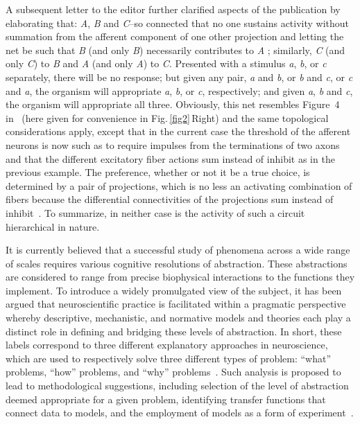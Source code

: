 \documentclass[10pt,letterpaper]{article}
\begin{document}
A subsequent letter to the editor further clarified aspects of the publication by elaborating that: {\it{A}}, {\it{B}} and {\it{C}}--so connected that no one sustains activity without summation from the afferent component of one other projection and letting the net be such that {\it{B}} (and only {\it{B}}) necessarily contributes to {\it{A}} ; similarly, {\it{C}} (and only {\it{C}}) to {\it{B}} and {\it{A}} (and only {\it{A}}) to {\it{C}}. Presented with a stimulus {\it{a}}, {\it{b}}, or {\it{c}} separately, there will be no response; but given any pair, {\it{a}} and {\it{b}}, or {\it{b}} and {\it{c}}, or {\it{c}} and {\it{a}}, the organism will appropriate {\it{a}}, {\it{b}}, or {\it{c}}, respectively; and given {\it{a}}, {\it{b}} and {\it{c}}, the organism will appropriate all three. Obviously, this net resembles Figure~4 in~\cite{mcculloch45a} (here given for convenience in Fig.\,\ref{fig2}\,Right) and the same topological considerations apply, except that in the current case the threshold of the afferent neurons is now such as to require impulses from the terminations of two axons and that the different excitatory fiber actions sum instead of inhibit as in the previous example. The preference, whether or not it be a true choice, is determined by a pair of projections, which is no less an activating combination of fibers because the differential connectivities of the projections sum instead of inhibit~\cite{mcculloch45b}. To summarize, in neither case is the activity of such a circuit hierarchical in nature.

It is currently believed that a successful study of phenomena across a wide range of scales requires various cognitive resolutions of abstraction. These abstractions are considered to range from precise biophysical interactions to the functions they implement. To introduce a widely promulgated view of the subject, it has been argued that neuroscientific practice is facilitated within a pragmatic perspective whereby descriptive, mechanistic, and normative models and theories each play a distinct role in defining and bridging these levels of abstraction. In short, these labels correspond to three different explanatory approaches in neuroscience, which are used to respectively solve three different types of problem: “what” problems, “how” problems, and “why” problems~\cite{dayan01}. Such analysis is proposed to lead to methodological suggestions, including selection of the level of abstraction deemed appropriate for a given problem, identifying transfer functions that connect data to models, and the employment of models as a form of experiment~\cite{levenstein23}.
\end{document}
